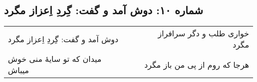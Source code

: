 \begin{center}
\section*{شماره ۱۰: دوش آمد و گفت: گِردِ اِعزاز مگرد}
\label{sec:010}
\begin{longtable}{l p{0.5cm} r}
دوش آمد و گفت: گِردِ اِعزاز مگرد
&&
خواری طلب و دگر سرافراز مگرد
\\
میدان که تو سایهٔ منی خوش میباش
&&
هرجا که روم از پی من باز مگرد
\\
\end{longtable}
\end{center}
